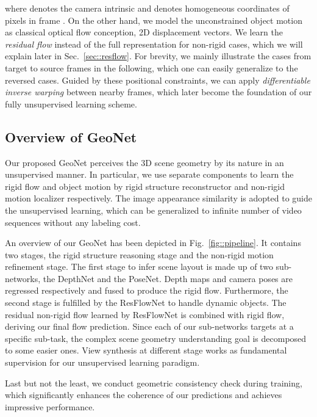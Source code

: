 where  denotes the camera intrinsic and  denotes homogeneous coordinates of pixels in frame . On the other hand, we model the unconstrained object motion as classical optical flow conception, \ie 2D displacement vectors. We learn the \textit{residual flow}  instead of the full representation for non-rigid cases, which we will explain later in Sec.~\ref{sec::resflow}. For brevity, we mainly illustrate the cases from target to source frames in the following, which one can easily generalize to the reversed cases. 
Guided by these positional constraints, we can apply \textit{differentiable inverse warping} \cite{JaderbergSZK15} between nearby frames, which later become the foundation of our fully unsupervised learning scheme. 

\subsection{Overview of GeoNet} \label{sec:overview}



Our proposed GeoNet perceives the 3D scene geometry by its nature in an unsupervised manner. In particular, we use separate components to learn the rigid flow and object motion by rigid structure reconstructor and non-rigid motion localizer respectively. The image appearance similarity is adopted to guide the unsupervised learning, which can be generalized to infinite number of video sequences without any labeling cost.

An overview of our GeoNet has been depicted in Fig.~\ref{fig::pipeline}. It contains two stages, the rigid structure reasoning stage and the non-rigid motion refinement stage. The first stage to infer scene layout is made up of two sub-networks, \ie the DepthNet and the PoseNet. Depth maps and camera poses are regressed respectively and fused to produce the rigid flow. Furthermore, the second stage is fulfilled by the ResFlowNet to handle dynamic objects. The residual non-rigid flow learned by ResFlowNet is combined with rigid flow, deriving our final flow prediction. Since each of our sub-networks targets at a specific sub-task, the complex scene geometry understanding goal is decomposed to some easier ones. View synthesis at different stage works as fundamental supervision for our unsupervised learning paradigm. 

Last but not the least, we conduct geometric consistency check during training, which significantly enhances the coherence of our predictions and achieves impressive performance.



